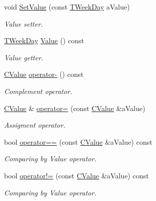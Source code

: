 \begin{DoxyCompactItemize}
void \hyperlink{class_c_value___t_week_day_1_1_c_value_a3b2ee2ee229058d33770ec4787eed8a5}{Set\+Value} (const \hyperlink{namespace_c_value___t_week_day_a6412f204509f223b789fb5f1a61a6124}{T\+Week\+Day} a\+Value)
\begin{DoxyCompactList}\small\item\em Value setter. \end{DoxyCompactList}\item 
\hyperlink{namespace_c_value___t_week_day_a6412f204509f223b789fb5f1a61a6124}{T\+Week\+Day} \hyperlink{class_c_value___t_week_day_1_1_c_value_ae77674d9367e894d5627330076f585c4}{Value} () const
\begin{DoxyCompactList}\small\item\em Value getter. \end{DoxyCompactList}\item 
\hyperlink{class_c_value___t_week_day_1_1_c_value}{C\+Value} \hyperlink{class_c_value___t_week_day_1_1_c_value_a19635da2959641b25cd017f3a8edad38}{operator-\/} () const
\begin{DoxyCompactList}\small\item\em Complement operator. \end{DoxyCompactList}\item 
\hyperlink{class_c_value___t_week_day_1_1_c_value}{C\+Value} \& \hyperlink{class_c_value___t_week_day_1_1_c_value_a8b2de98efd431f204874ad7af5b6a712}{operator=} (const \hyperlink{class_c_value___t_week_day_1_1_c_value}{C\+Value} \&a\+Value)
\begin{DoxyCompactList}\small\item\em Assigment operator. \end{DoxyCompactList}\item 
bool \hyperlink{class_c_value___t_week_day_1_1_c_value_a24d761dc0cf9194eeff9750c92a8c6c5}{operator==} (const \hyperlink{class_c_value___t_week_day_1_1_c_value}{C\+Value} \&a\+Value) const
\begin{DoxyCompactList}\small\item\em Comparing by Value operator. \end{DoxyCompactList}\item 
bool \hyperlink{class_c_value___t_week_day_1_1_c_value_a22aa06908f1555784b3ff229c5a94da9}{operator!=} (const \hyperlink{class_c_value___t_week_day_1_1_c_value}{C\+Value} \&a\+Value) const
\begin{DoxyCompactList}\small\item\em Comparing by Value operator. \end{DoxyCompactList}\item 

\end{DoxyCompactItemize}
